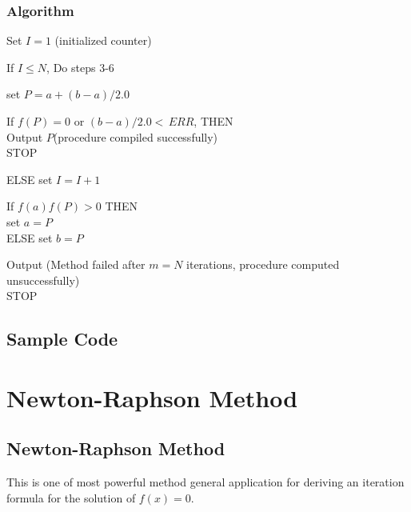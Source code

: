 \documentclass[12pt,class=book,crop=false]{standalone}
\begin{document}
\subsubsection{Algorithm}
\begin{enumerate}[label={Step \arabic* :} ]
    \item Set \( I=1 \) (initialized counter)
    \item If \( I\leq N \), Do steps 3-6
          {\setlength\itemindent{50pt}\item set \( P=a+(b-a)/2.0 \)}
          {\setlength\itemindent{50pt}\item If \( f(P)=0 \) or \( (b-a)/2.0 <\, ERR\), THEN\\
          \-\hspace{1.55cm} Output \( P \)(procedure compiled successfully)\\
          \-\hspace{1.55cm} STOP}
          {\setlength\itemindent{50pt}\item ELSE set \( I=I+1 \)}
          {\setlength\itemindent{50pt}\item If \( f(a)f(P)>0 \) THEN\\
          \-\hspace{1.55cm} set \( a=P \)\\
          \-\hspace{1.55cm} ELSE set \( b=P \)}
    \item Output (Method failed after \( m=N \) iterations,
          procedure computed unsuccessfully)\\
          STOP
\end{enumerate}
\newpage
\subsection{Sample Code}

\newpage
\section{Newton-Raphson Method}
\subsection{Newton-Raphson Method}
This is one of most powerful method general application for deriving an iteration formula for the solution of \( f(x)=0 \).
\end{document}
